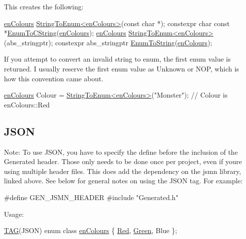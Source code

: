 This creates the following\+: 
\begin{DoxyCode}
\hyperlink{PreprocTest_8h_a081cf1a0e70d6e2bd48c98f457742877}{enColours} \hyperlink{Generated__Test_8h_ad369bcb4826dc155da6b130a0fa97d13}{StringToEnum<enColours>}(\textcolor{keyword}{const} \textcolor{keywordtype}{char} *);
constexpr \textcolor{keywordtype}{char} \textcolor{keyword}{const} *\hyperlink{Generated__Test_8h_a37220bfe6977f9507cffa3283af7f09b}{EnumToCString}(\hyperlink{PreprocTest_8h_a081cf1a0e70d6e2bd48c98f457742877}{enColours});
\hyperlink{PreprocTest_8h_a081cf1a0e70d6e2bd48c98f457742877}{enColours} \hyperlink{Generated__Test_8h_ad369bcb4826dc155da6b130a0fa97d13}{StringToEnum<enColours>}(abs\_stringptr);
constexpr abs\_stringptr \hyperlink{Generated__Test_8h_a6087c1644a941337a7e8ac43157a30b3}{EnumToString}(\hyperlink{PreprocTest_8h_a081cf1a0e70d6e2bd48c98f457742877}{enColours});
\end{DoxyCode}


If you attempt to convert an invalid string to enum, the first enum value is returned. I usually reserve the first enum value as \textquotesingle{}Unknown\textquotesingle{} or \textquotesingle{}N\+OP\textquotesingle{}, which is how this convention came about.


\begin{DoxyCode}
\hyperlink{PreprocTest_8h_a081cf1a0e70d6e2bd48c98f457742877}{enColours} Colour = \hyperlink{Generated__Test_8h_ad369bcb4826dc155da6b130a0fa97d13}{StringToEnum<enColours>}(\textcolor{stringliteral}{"Monster"});
\textcolor{comment}{// Colour is enColours::Red}
\end{DoxyCode}
\hypertarget{index_autotoc_md10}{}\subsection{J\+S\+ON}\label{index_autotoc_md10}
Note\+: To use J\+S\+ON, you have to specify the define before the inclusion of the Generated header. Those only needs to be done once per project, even if you\textquotesingle{}re using multiple header files. This does add the dependency on the jsmn library, linked above. See below for general notes on using the J\+S\+ON tag. For example\+:


\begin{DoxyCode}
\textcolor{preprocessor}{#define GEN\_JSMN\_HEADER}
\textcolor{preprocessor}{#include "Generated.h"}
\end{DoxyCode}


Usage\+: 
\begin{DoxyCode}
\hyperlink{PreprocTest_8h_a2606cd56d2d8f567785bde5848176722}{TAG}(JSON)
\textcolor{keyword}{enum class} \hyperlink{PreprocTest_8h_a081cf1a0e70d6e2bd48c98f457742877}{enColours}
\{
    \hyperlink{PreprocTest_8h_a081cf1a0e70d6e2bd48c98f457742877aee38e4d5dd68c4e440825018d549cb47}{Red},
    \hyperlink{PreprocTest_8h_a081cf1a0e70d6e2bd48c98f457742877ad382816a3cbeed082c9e216e7392eed1}{Green},
    Blue
\};
\end{DoxyCode}


